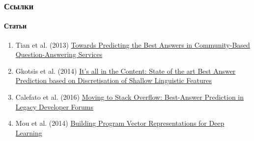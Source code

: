 \documentclass[10pt]{beamer}
\begin{document}
\begin{frame}
\frametitle{Ссылки}
\framesubtitle{Статьи}

\begin{enumerate}
    \item \begin{thebibliography}{99}
             Tian et al. (2013)
            \newblock \href{http://www.public.asu.edu/~bli24/Papers/ICWSM2013.pdf}{Towards Predicting the Best Answers in Community-Based Question-Answering Services}
        \end{thebibliography}
    \item \begin{thebibliography}{99}
             Gkotsis et al. (2014)
            \newblock \href{https://dl.acm.org/citation.cfm?id=2615569.2615681}{It’s all in the Content: State of the art Best Answer Prediction based on Discretisation of Shallow Linguistic Features}
        \end{thebibliography}
    \item \begin{thebibliography}{99}
             Calefato et al. (2016)
            \newblock \href{https://dl.acm.org/citation.cfm?id=2962585}{Moving to Stack Overflow: Best-Answer Prediction in Legacy Developer Forums}
        \end{thebibliography}
    \item \begin{thebibliography}{99}
             Mou et al. (2014)
            \newblock \href{https://arxiv.org/abs/1409.3358}{Building Program Vector Representations for Deep Learning}
        \end{thebibliography}
\end{enumerate}

\end{frame}


\end{document}
